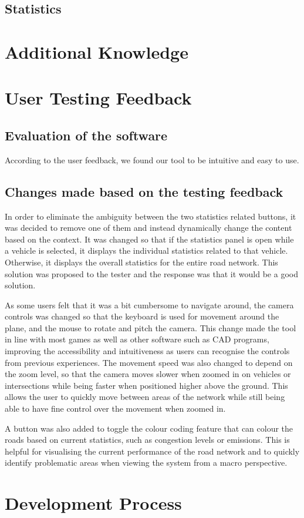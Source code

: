     \subsection{Statistics}

\section{Additional Knowledge}

\section{User Testing Feedback}
    \subsection{Evaluation of the software}
        According to the user feedback, we found our tool to be intuitive and easy to use.

    \subsection{Changes made based on the testing feedback}
        In order to eliminate the ambiguity between the two statistics related buttons, it was decided to remove one of them and instead dynamically change the content based on the context. It was changed so that if the statistics panel is open while a vehicle is selected, it displays the individual statistics related to that vehicle. Otherwise, it displays the overall statistics for the entire road network. This solution was proposed to the tester and the response was that it would be a good solution.

        As some users felt that it was a bit cumbersome to navigate around, the camera controls was changed so that the keyboard is used for movement around the plane, and the mouse to rotate and pitch the camera. This change made the tool in line with most games as well as other software such as CAD programs, improving the accessibility and intuitiveness as users can recognise the controls from previous experiences. The movement speed was also changed to depend on the zoom level, so that the camera moves slower when zoomed in on vehicles or intersections while being faster when positioned higher above the ground. This allows the user to quickly move between areas of the network while still being able to have fine control over the movement when zoomed in.

        A button was also added to toggle the colour coding feature that can colour the roads based on current statistics, such as congestion levels or emissions. This is helpful for visualising the current performance of the road network and to quickly identify problematic areas when viewing the system from a macro perspective.
    
    

\section{Development Process}
